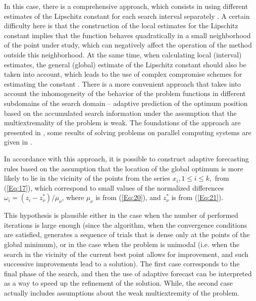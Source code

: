 \documentclass[
11pt,%
tightenlines,%
twoside,%
onecolumn,%
nofloats,%
nobibnotes,%
nofootinbib,%
superscriptaddress,%
noshowpacs,%
centertags]%
{revtex4}
\begin{document}
In this case, there is a comprehensive approach, which consists in using different estimates of the Lipschitz constant for each search interval separately \cite{Sergeyev2003,Sergeyev2007}.
A certain difficulty here is that the construction of the local estimates for the Lipschitz constant implies that the function behaves quadratically in a small neighborhood of the point under study, which can negatively affect the operation of the method outside this neighborhood.
At the same time, when calculating local (interval) estimates, the general (global) estimate of the Lipschitz constant should also be taken into account, which leads to the use of complex compromise schemes for estimating the constant \cite{Sergeyev2020}.
There is a more convenient approach that takes into account the inhomogeneity of the behavior of the problem functions in different subdomains of the search domain -- adaptive prediction of the optimum position based on the accumulated search information under the assumption that the multiextremality of the problem is weak. The foundations of the approach are presented in \cite{Strongin2000}, some results of solving problems on parallel computing systems are given in  \cite{Barkalov2010}.

In accordance with this approach, it is possible to construct adaptive forecasting rules based on the assumption that the location of the global optimum is more likely to lie in the vicinity of the points from the series $x_i, 1 \leq i \leq k,$ from (\ref{Eq:17}), which correspond to small values of the normalized differences $\omega_i=(z_i-z_\nu^*)/\mu_\nu$, where $\mu_\nu$ is from (\ref{Eq:20}), and $z_\nu^*$ is from  (\ref{Eq:21}).

This hypothesis is plausible either in the case when the number of performed iterations is large enough (since the algorithm, when the convergence conditions are satisfied, generates a sequence of trials that is dense only at the points of the global minimum), or in the case when the problem is unimodal (i.e. when the search in the vicinity of the current best point allows for improvement, and such successive improvements lead to a solution). The first case corresponds to the final phase of the search, and then the use of adaptive forecast can be interpreted as a way to speed up the refinement of the solution. While, the second case actually includes assumptions about the weak multiextremity of the problem.
\end{document}
